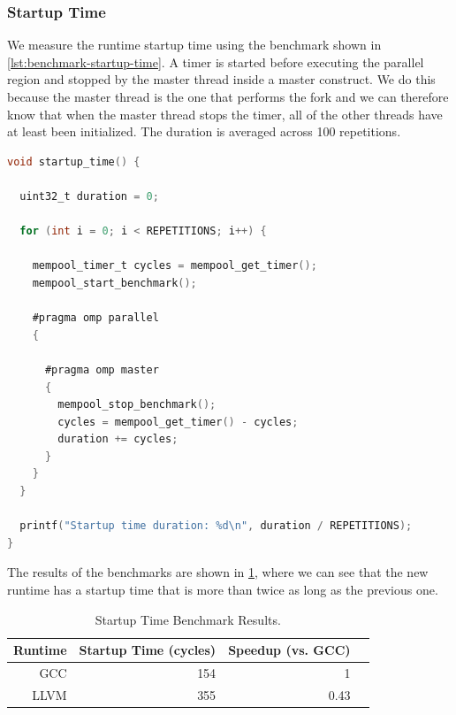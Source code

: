\subsubsection{Startup Time}

We measure the runtime startup time using the benchmark shown in \cref{lst:benchmark-startup-time}. A
timer is started before executing the parallel region and stopped by the master thread inside a
master construct. We do this because the master thread is the one that performs the fork and we can
therefore know that when the master thread stops the timer, all of the other threads have at least
been initialized. The duration is averaged across 100 repetitions.

\begin{lstlisting}[language=C, caption={Startup Time Benchmark},
                   label={lst:benchmark-startup-time}]
void startup_time() {

  uint32_t duration = 0;

  for (int i = 0; i < REPETITIONS; i++) {

    mempool_timer_t cycles = mempool_get_timer();
    mempool_start_benchmark();

    #pragma omp parallel
    {

      #pragma omp master
      {
        mempool_stop_benchmark();
        cycles = mempool_get_timer() - cycles;
        duration += cycles;
      }
    }
  }

  printf("Startup time duration: %d\n", duration / REPETITIONS);
}
\end{lstlisting}

The results of the benchmarks are shown in \cref{tbl:benchmark-startup-time}, where we can see that
the new runtime has a startup time that is more than twice as long as the previous one.

\begin{table}[h]
	\centerfloat
	\begin{tabular}{ r r r r }
		\toprule
		\textbf{Runtime} & \textbf{Startup Time (cycles)} & \textbf{Speedup (vs. GCC)} \\
		\midrule
		GCC              & 154                            & 1                          \\
		LLVM             & 355                            & 0.43                       \\
		\bottomrule
	\end{tabular}
	\caption{Startup Time Benchmark Results.}%
	\label{tbl:benchmark-startup-time}
\end{table}

